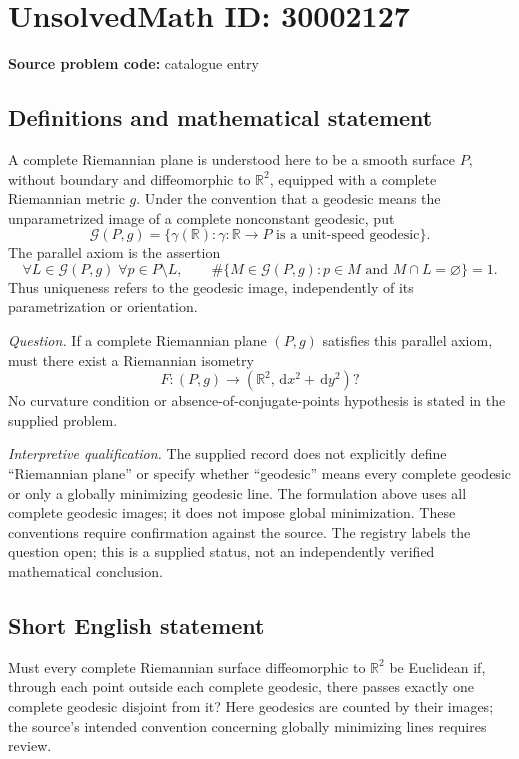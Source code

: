 \documentclass[11pt]{article}
\newcommand{\R}{\mathbb{R}}
\newcommand{\dd}{\,\mathrm{d}}
\begin{document}
\section*{UnsolvedMath ID: 30002127}
\textbf{Source problem code:} catalogue entry
\subsection{Definitions and mathematical statement}
A complete Riemannian plane is understood here to be a smooth surface \(P\), without boundary and diffeomorphic to \(\R^2\), equipped with a complete Riemannian metric \(g\). Under the convention that a geodesic means the unparametrized image of a complete nonconstant geodesic, put
\[
\mathcal G(P,g)=\{\gamma(\R):\gamma\colon\R\to P\text{ is a unit-speed geodesic}\}.
\]
The parallel axiom is the assertion
\[
\forall L\in\mathcal G(P,g)\;\forall p\in P\setminus L,\qquad
\#\{M\in\mathcal G(P,g):p\in M\text{ and }M\cap L=\varnothing\}=1.
\]
Thus uniqueness refers to the geodesic image, independently of its parametrization or orientation.

\emph{Question.} If a complete Riemannian plane \((P,g)\) satisfies this parallel axiom, must there exist a Riemannian isometry
\[
F\colon(P,g)\longrightarrow(\R^2,\dd x^2+\dd y^2)?
\]
No curvature condition or absence-of-conjugate-points hypothesis is stated in the supplied problem.

\emph{Interpretive qualification.} The supplied record does not explicitly define ``Riemannian plane'' or specify whether ``geodesic'' means every complete geodesic or only a globally minimizing geodesic line. The formulation above uses all complete geodesic images; it does not impose global minimization. These conventions require confirmation against the source. The registry labels the question open; this is a supplied status, not an independently verified mathematical conclusion.
\subsection{Short English statement}
Must every complete Riemannian surface diffeomorphic to \(\R^2\) be Euclidean if, through each point outside each complete geodesic, there passes exactly one complete geodesic disjoint from it? Here geodesics are counted by their images; the source's intended convention concerning globally minimizing lines requires review.
\end{document}
